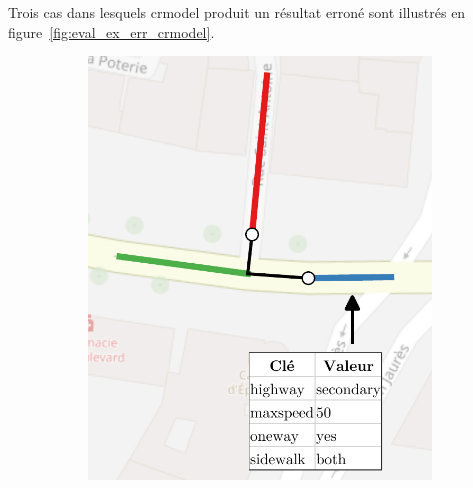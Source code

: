 \newpar{}

Trois cas dans lesquels crmodel produit un résultat erroné sont illustrés en figure~\ref{fig:eval_ex_err_crmodel}.

\begin{figure}[ht]
    \centering
    \begin{subfigure}[t]{.3\linewidth}
        \centering
        \includegraphics[width=\linewidth]{images/evaluation/crmodel/eval_cas1.pdf}
        \caption{}
    \end{subfigure}
    \begin{subfigure}[t]{.3\linewidth}
        \centering

\end{subfigure}
\end{figure}
